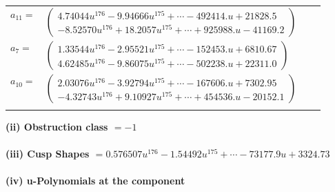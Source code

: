 \documentclass[1p]{elsarticle_modified}
\theoremstyle{definition}
\begin{document}
\begin{tabular}{m{7pt} m{180pt} m{7pt} m{180pt} }
\flushright $a_{11}=$&$\begin{pmatrix}4.74044 u^{176}-9.94666 u^{175}+\cdots-492414. u+21828.5\\-8.52570 u^{176}+18.2057 u^{175}+\cdots+925988. u-41169.2\end{pmatrix}$ \\
\flushright $a_{7}=$&$\begin{pmatrix}1.33544 u^{176}-2.95521 u^{175}+\cdots-152453. u+6810.67\\4.62485 u^{176}-9.86075 u^{175}+\cdots-502238. u+22311.0\end{pmatrix}$ \\
\flushright $a_{10}=$&$\begin{pmatrix}2.03076 u^{176}-3.92794 u^{175}+\cdots-167606. u+7302.95\\-4.32743 u^{176}+9.10927 u^{175}+\cdots+454536. u-20152.1\end{pmatrix}$\\&\end{tabular}
\flushleft \textbf{(ii) Obstruction class $= -1$}\\~\\
\flushleft \textbf{(iii) Cusp Shapes $= 0.576507 u^{176}-1.54492 u^{175}+\cdots-73177.9 u+3324.73$}\\~\\
\newpage\renewcommand{\arraystretch}{1}
\flushleft \textbf{(iv) u-Polynomials at the component}\newline \\
\end{document}
